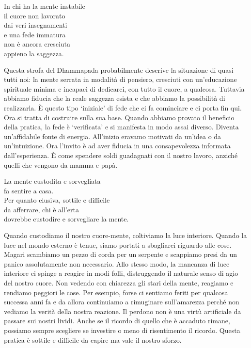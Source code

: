 
\begin{dhpVerse}{38}
\label{dhp-38}
In chi ha la mente instabile\\
il cuore non lavorato\\
dai veri insegnamenti\\
e una fede immatura\\
non è ancora cresciuta\\
appieno la saggezza.
\end{dhpVerse}

\begin{dhpRefl}
  Questa strofa del Dhammapada probabilmente descrive la situazione di quasi
  tutti noi: la mente serrata in modalità di pensiero, cresciuti con
  un'educazione spirituale minima e incapaci di dedicarci, con tutto il cuore, a
  qualcosa. Tuttavia abbiamo fiducia che la reale saggezza esista e che abbiamo
  la possibilità di realizzarla. È questo tipo `iniziale' di fede che ci fa
  cominciare e ci porta fin qui. Ora si tratta di costruire sulla sua base.
  Quando abbiamo provato il beneficio della pratica, la fede è `verificata' e si
  manifesta in modo assai diverso. Diventa un'affidabile fonte di energia.
  All'inizio eravamo motivati da un'idea o da un'intuizione. Ora l'invito è ad
  aver fiducia in una consapevolezza informata dall'esperienza. È come spendere
  soldi guadagnati con il nostro lavoro, anziché quelli che vengono da mamma e
  papà.
\end{dhpRefl}


\begin{dhpVerse}{36}
\label{dhp-36}
La mente custodita e sorvegliata\\
fa sentire a casa.\\
Per quanto elusiva, sottile e difficile\\
da afferrare, chi è all'erta\\
dovrebbe custodire e sorvegliare la mente.
\end{dhpVerse}

\begin{dhpRefl}
  Quando custodiamo il nostro cuore-mente, coltiviamo la luce interiore. Quando
  la luce nel mondo esterno è tenue, siamo portati a sbagliarci riguardo alle
  cose. Magari scambiamo un pezzo di corda per un serpente e scappiamo presi da
  un panico assolutamente non necessario. Allo stesso modo, la mancanza di luce
  interiore ci spinge a reagire in modi folli, distruggendo il naturale senso di
  agio del nostro cuore. Non vedendo con chiarezza gli stari della mente,
  reagiamo e rendiamo peggiori le cose. Per esempio, forse ci sentiamo feriti
  per qualcosa successa anni fa e da allora continuiamo a rimuginare
  sull'amarezza perché non vediamo la verità della nostra reazione. Il perdono
  non è una virtù artificiale da passare sui nostri lividi. Anche se il ricordo
  di quello che è accaduto rimane, possiamo sempre scegliere se investire o meno
  di risentimento il ricordo. Questa pratica è sottile e difficile da capire ma
  vale il nostro sforzo.
\end{dhpRefl}


